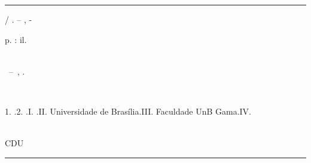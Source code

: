 \begin{fichacatalografica}
	\vspace*{\fill}					%
	\hrule							%
	\begin{center}					%
	\begin{minipage}[c]{12.5cm}		%
	
	\imprimirautor
	
	\hspace{0.5cm} \imprimirtitulo  / \imprimirautor. --
	\imprimirlocal, \imprimirdata -
	
	\hspace{0.5cm} \pageref{LastPage} p. : il. \\%
	
	\hspace{0.5cm} \imprimirorientadorRotulo~\imprimirorientador\\
	
	\hspace{0.5cm}
	\parbox[t]{\textwidth}{\imprimirtipotrabalho~--~\imprimirinstituicao,
	\imprimirdata.}\\
	
	\hspace{0.5cm}
	\parbox[t]{\textwidth}{1. \imprimirpalavrachaveum.2. \imprimirpalavrachavedois.I. \imprimirorientador.II. Universidade de Brasília.III. Faculdade UnB Gama.IV. \imprimirtitulo}\\ 			
	
	\hspace{8.75cm} CDU \nomecdu\\
	
	\end{minipage}
	\end{center}
	\hrule
\end{fichacatalografica}
